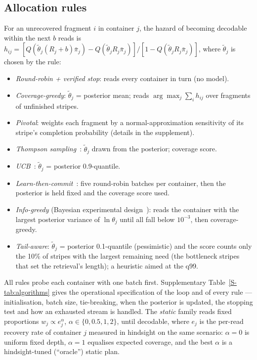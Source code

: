 \documentclass[conference,onecolumn,11pt]{IEEEtran}
\begin{document}
\subsection{Allocation rules}
For an unrecovered fragment $i$ in container $j$, the hazard of becoming decodable within the
next $b$ reads is
$h_{ij}=[Q(\tilde\theta_j(R_j{+}b)\bar\pi_j)-Q(\tilde\theta_jR_j\bar\pi_j)]/[1-Q(\tilde\theta_jR_j\bar\pi_j)]$,
where $\tilde\theta_j$ is chosen by the rule:
\begin{itemize}
\item \emph{Round-robin + verified stop}: reads every container in turn (no model).
\item \emph{Coverage-greedy}: $\tilde\theta_j$ = posterior mean; reads $\arg\max_j\sum_i h_{ij}$
over fragments of unfinished stripes.
\item \emph{Pivotal}: weights each fragment by a normal-approximation sensitivity of its
stripe's completion probability (details in the supplement).
\item \emph{Thompson sampling}~\cite{thompson1933likelihood,russo2018tutorial}: $\tilde\theta_j$
drawn from the posterior; coverage score.
\item \emph{UCB}~\cite{auer2002finite}: $\tilde\theta_j$ = posterior 0.9-quantile.
\item \emph{Learn-then-commit}~\cite{garivier2016explore}: five round-robin batches per
container, then the posterior is held fixed and the coverage score used.
\item \emph{Info-greedy} (Bayesian experimental design~\cite{chaloner1995bayesian}): reads the
container with the largest posterior variance of $\ln\theta_j$ until all fall below $10^{-3}$,
then coverage-greedy.
\item \emph{Tail-aware}: $\tilde\theta_j$ = posterior 0.1-quantile (pessimistic) and the score
counts only the 10\% of stripes with the largest remaining need (the bottleneck stripes that
set the retrieval's length); a heuristic aimed at the q99.
\end{itemize}
All rules probe each container with one batch first.  Supplementary Table~\ref{S-tab:algorithms} gives the
operational specification of the loop and of every rule --- initialisation, batch size, tie-breaking,
when the posterior is updated, the stopping test and how an exhausted stream is handled.  The
\emph{static} family reads fixed
proportions $w_j\propto e_j^{\alpha}$, $\alpha\in\{0,0.5,1,2\}$, until decodable, where $e_j$ is
the per-read recovery rate of container $j$ measured in hindsight on the same scenario:
$\alpha{=}0$ is uniform fixed depth, $\alpha{=}1$ equalises expected coverage, and the best
$\alpha$ is a hindsight-tuned (``oracle'') static plan.
\end{document}
